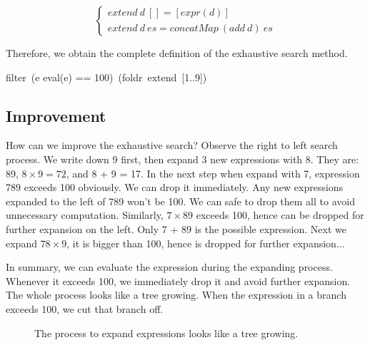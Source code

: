 \documentclass{article}
\begin{document}
\[
\begin{cases}
extend\ d\ [] = [expr(d)] \\
extend\ d\ es = concatMap\ (add\ d)\ es
\end{cases}
\]

Therefore, we obtain the complete definition of the exhaustive search method.

\be
filter\ (e \mapsto eval(e) == 100)\ (foldr\ extend\ [1..9])
\label{eq:puzzle100-basic}
\ee

\subsection{Improvement}

How can we improve the exhaustive search? Observe the right to left search process. We write down 9 first, then expand 3 new expressions with 8. They are: 89, $8 \times 9 = 72$, and 8 + 9 = 17. In the next step when expand with 7, expression 789 exceeds 100 obviously. We can drop it immediately. Any new expressions expanded to the left of 789 won't be 100. We can safe to drop them all to avoid unnecessary computation. Similarly, $7 \times 89$ exceeds 100, hence can be dropped for further expansion on the left. Only 7 + 89 is the possible expression. Next we expand $78 \times 9$, it is bigger than 100, hence is dropped for further expansion...

In summary, we can evaluate the expression during the expanding process. Whenever it exceeds 100, we immediately drop it and avoid further expansion. The whole process looks like a tree growing. When the expression in a branch exceeds 100, we cut that branch off.

\begin{figure}[htbp]
\centering
{}
\caption{The process to expand expressions looks like a tree growing.}
\end{figure}
\end{document}

